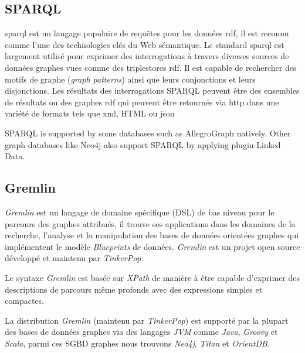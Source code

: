   \subsection{SPARQL}
  \label{sec:sparql}

  \acrshort{sparql} \cite{prud2008sparql} est un langage populaire de
  requêtes pour les données \acrshort{rdf}, il est reconnu comme l'une
  des technologies clés du Web sémantique. Le standard
  \acrshort{sparql} est largement utilisé pour exprimer des
  interrogations à travers diverses sources de données graphes vues
  comme des triplestores \acrshort{rdf}. Il est capable de rechercher
  des motifs de graphe (\emph{graph patterns}) ainsi que leurs
  conjonctions et leurs disjonctions. Les résultats des interrogations
  \textsc{SPARQL} peuvent être des ensembles de résultats ou des
  graphes \acrshort{rdf} qui peuvent être retournés via
  \acrshort{http} dans une variété de formats tels que \acrshort{xml},
  HTML ou \acrshort{json}


  {\color{red} \textsc{SPARQL} is supported by some databases such as
    AllegroGraph natively. Other graph databases like Neo4j also
    support \textsc{SPARQL} by applying plugin Linked Data.  }



  \subsection{Gremlin}
  \label{sec:gremlin}
  \emph{Gremlin} \cite{gremlin-wiki} est un langage de domaine
  spécifique (\acrshort{DSL}) de bas niveau pour le parcours des
  graphes attribués, il trouve ses applications dans les domaines de
  la recherche, l'analyse et la manipulation des bases de données
  orientées graphes qui implémentent le modèle \emph{Blueprints}
  \cite{blueprints} de données. \emph{Gremlin} \cite{gremlin-wiki} est
  un projet open source développé et maintenu par \emph{TinkerPop}.

  Le syntaxe \emph{Gremlin} est basée sur \emph{XPath} de manière à
  être capable d'exprimer des descriptions de parcours même profonds
  avec des expressions simples et compactes.


  La distribution \emph{Gremlin} (maintenu par \emph{TinkerPop}) est
  supporté par la plupart des bases de données graphes via des
  langages \emph{JVM} comme \emph{Java}, \emph{Groovy} et
  \emph{Scala}, parmi ces \acrshort{SGBD} graphes nous trouvons
  \emph{Neo4j}, \emph{Titan} et \emph{OrientDB}.

